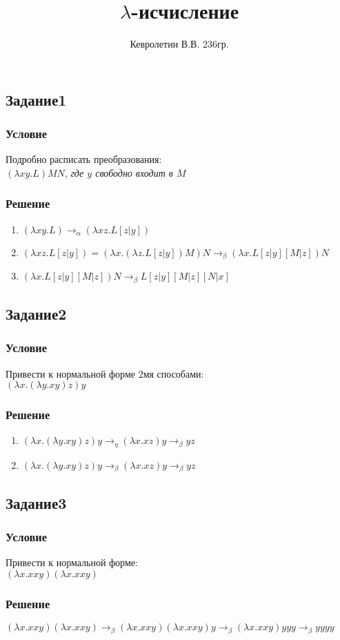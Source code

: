 \documentclass[10pt,a4paper]{article}
\author{Кевролетин В.В. 236гр.}
\title{$\lambda$-исчисление}
\begin{document}
\maketitle

\subsection*{Задание1}
\subsubsection*{Условие}
Подробно расписать преобразования:\\
$(\lambda xy.L)MN$, \textit{где $y$ свободно входит в $M$}
\subsubsection*{Решение}

\begin{enumerate}
  \item $(\lambda xy.L) \longrightarrow_\alpha (\lambda xz.L[z|y])$
  \item $(\lambda xz.L[z|y]) = (\lambda x.(\lambda z.L[z|y])M)N \longrightarrow_\beta
(\lambda x.L[z|y][M|z])N$
  \item $(\lambda x.L[z|y][M|z])N \longrightarrow_\beta L[z|y][M|z][N|x]$
\end{enumerate}

\subsection*{Задание2}
\subsubsection*{Условие}
Привести к нормальной форме 2мя способами:\\
$(\lambda x.(\lambda y.xy)z)y$
\subsubsection*{Решение}

\begin{enumerate}
  \item $(\lambda x.(\lambda y.xy)z)y \longrightarrow_\eta (\lambda
    x.xz)y \longrightarrow_\beta yz$
  \item $(\lambda x.(\lambda y.xy)z)y \longrightarrow_\beta (\lambda
    x.xz)y \longrightarrow_\beta yz$
\end{enumerate}

\subsection*{Задание3}
\subsubsection*{Условие}
Привести к нормальной форме:\\
$(\lambda x.xxy)(\lambda x.xxy)$
\subsubsection*{Решение}
$(\lambda x.xxy)(\lambda x.xxy) \longrightarrow_\beta  (\lambda
x.xxy)(\lambda x.xxy)y \longrightarrow_\beta (\lambda
x.xxy)yyy \longrightarrow_\beta yyyy$
\end{document}
